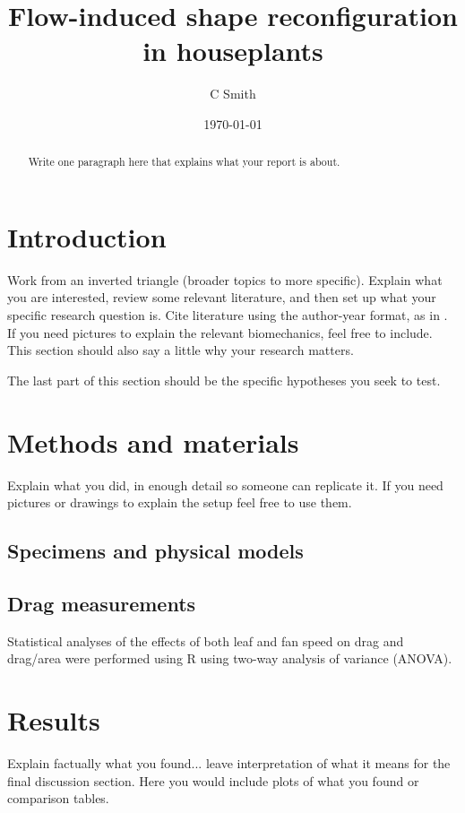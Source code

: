 \documentclass{article}
\title{Flow-induced shape reconfiguration in houseplants}
\author{C Smith}
\date{\today}
\begin{document}
\maketitle
\begin{abstract}
Write one paragraph here that explains what your report is about.
\end{abstract}

\section{Introduction}
Work from an inverted triangle (broader topics to more specific). Explain what you are interested, review some relevant literature, and then set up what your specific research question is. Cite literature using the author-year format, as in \citep{buck2020go}. If you need pictures to explain the relevant biomechanics, feel free to include. This section should also say a little why your research matters. 

The last part of this section should be the specific hypotheses you seek to test. 

\section{Methods and materials}
Explain what you did, in enough detail so someone can replicate it. If you need pictures or drawings to explain the setup feel free to use them. 

\subsection{Specimens and physical models}
\subsection{Drag measurements}
Statistical analyses of the effects of both leaf and fan speed on drag and drag/area were performed using R \citep{r2020} using two-way analysis of variance (ANOVA).

\section{Results}
Explain factually what you found... leave interpretation of what it means for the final discussion section. Here you would include plots of what you found or comparison tables.
\end{document}
